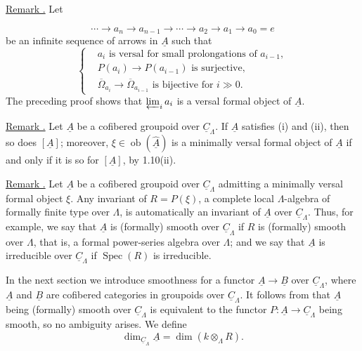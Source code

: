 \underline{Remark .} Let


\[
 \cdots\longrightarrow a_n\longrightarrow a_{n-1}
 \longrightarrow\cdots\longrightarrow a_2\longrightarrow a_1
 \longrightarrow a_0=e
\]
be an infinite sequence of arrows in $\underline A$ such that
\[
\left\{
\begin{aligned}
&a_i\text{ is versal for small prolongations of }a_{i-1},\\
&P(a_i)\longrightarrow P(a_{i-1})\text{ is surjective},\\
&\overline\Omega_{a_i}\longrightarrow
 \overline\Omega_{a_{i-1}}\text{ is bijective for }i\gg0.
\end{aligned}
\right.
\]
The preceding proof shows that $\varprojlim_i a_i$ is a versal formal
object of $\underline A$.

\underline{Remark .} Let $\underline A$ be a cofibered groupoid
over $\underline C_\Lambda$. If $\underline A$ satisfies (i) and
(ii), then so does $[\underline A]$; moreover,
$\xi\in\operatorname{ob}(\widehat{\underline A})$ is a minimally
versal formal object of $\underline A$ if and only if it is so for
$[\underline A]$, by 1.10(ii).

\underline{Remark .} Let $\underline A$ be a cofibered groupoid
over $\underline C_\Lambda$ admitting a minimally versal formal
object $\xi$. Any invariant of $R=P(\xi)$, a complete local
$\Lambda$-algebra of formally finite type over $\Lambda$, is
automatically an invariant of $\underline A$ over
$\underline C_\Lambda$. Thus, for example, we say that $\underline A$
is (formally) smooth over $\underline C_\Lambda$ if $R$ is
(formally) smooth over $\Lambda$, that is, a formal power-series
algebra over $\Lambda$; and we say that $\underline A$ is irreducible over
$\underline C_\Lambda$ if $\operatorname{Spec}(R)$ is irreducible.

In the next section we introduce smoothness for a functor
$\underline A\longrightarrow\underline B$ over
$\underline C_\Lambda$, where $\underline A$ and $\underline B$ are
cofibered categories in groupoids over $\underline C_\Lambda$.
It follows from  that $\underline A$ being (formally) smooth over
$\underline C_\Lambda$ is equivalent to the functor
$P:\underline A\longrightarrow\underline C_\Lambda$ being smooth,
so no ambiguity arises. We define
\[
 \dim_{\underline C_\Lambda}\underline A
   =\dim(k\otimes_\Lambda R).
\]

